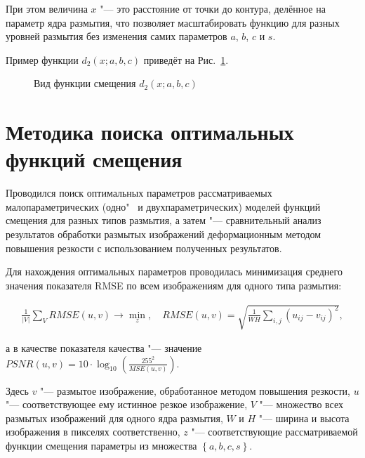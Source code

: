 При этом величина $x$ "--- это расстояние от точки до контура, делённое на параметр ядра размытия, что позволяет масштабировать функцию для разных уровней размытия без изменения самих параметров $a$, $b$, $c$ и $s$.

Пример функции $d_2(x; a, b, c)$ приведёт на Рис.~\ref{fig:warping-d2-example}.

\begin{figure}[ht]
	\caption{Вид функции смещения $d_2(x;a,b,c)$}
	\label{fig:warping-d2-example}
\end{figure}

\section{Методика поиска оптимальных функций смещения}

Проводился поиск оптимальных параметров рассматриваемых малопараметрических (одно"~ и двухпараметрических) моделей функций смещения для разных типов размытия, а затем "--- сравнительный анализ результатов обработки размытых изображений деформационным методом повышения резкости с использованием полученных результатов.

Для нахождения оптимальных параметров проводилась минимизация среднего значения показателя RMSE по всем изображениям для одного типа размытия:

\begin{align*}
	\frac{1}{\left|V\right|}\sum_{V}{RMSE\left(u,v\right) \rightarrow \min_{z}}, \quad
	RMSE\left(u,v\right)=\sqrt{\frac{1}{WH}\sum_{i,j}{(u_{ij}-v_{ij})}^2},
\end{align*}

%

\noindent а в качестве показателя качества "--- значение $PSNR\left(u,v\right) = 10 \cdot \log_{10}{\left(\frac{255^2}{MSE\left(u,v\right)}\right)}$.

Здесь $v$ "--- размытое изображение, обработанное методом повышения резкости, $u$ "--- соответствующее ему истинное резкое изображение, $V$ "--- множество всех размытых изображений для одного ядра размытия, $W$ и $H$ "--- ширина и высота изображения в пикселях соответственно, $z$ "--- соответствующие рассматриваемой функции смещения параметры из множества $\left\{a, b, c, s\right\}$.

